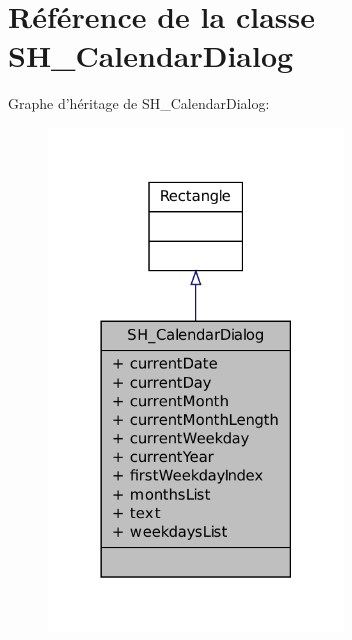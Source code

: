 \hypertarget{classSH__CalendarDialog}{\section{Référence de la classe S\-H\-\_\-\-Calendar\-Dialog}
\label{classSH__CalendarDialog}
}


Graphe d'héritage de S\-H\-\_\-\-Calendar\-Dialog\-:\nopagebreak
\begin{figure}[H]
\begin{center}
\leavevmode
\includegraphics[width=222pt]{classSH__CalendarDialog__inherit__graph}
\end{center}
\end{figure}


